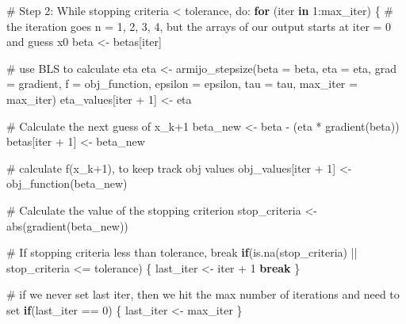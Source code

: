 \documentclass[
  letterpaper,
  DIV=11,
  numbers=noendperiod]{scrartcl}
\newenvironment{Shaded}{\begin{snugshade}}{\end{snugshade}}
\newcommand{\AttributeTok}[1]{\textcolor[rgb]{0.40,0.45,0.13}{#1}}
\newcommand{\CommentTok}[1]{\textcolor[rgb]{0.37,0.37,0.37}{#1}}
\newcommand{\ControlFlowTok}[1]{\textcolor[rgb]{0.00,0.23,0.31}{\textbf{#1}}}
\newcommand{\DecValTok}[1]{\textcolor[rgb]{0.68,0.00,0.00}{#1}}
\newcommand{\FunctionTok}[1]{\textcolor[rgb]{0.28,0.35,0.67}{#1}}
\newcommand{\NormalTok}[1]{\textcolor[rgb]{0.00,0.23,0.31}{#1}}
\newcommand{\OtherTok}[1]{\textcolor[rgb]{0.00,0.23,0.31}{#1}}
\newcommand{\SpecialCharTok}[1]{\textcolor[rgb]{0.37,0.37,0.37}{#1}}
\begin{document}
\begin{Shaded}
\begin{Highlighting}[]
  \CommentTok{\# Step 2: While stopping criteria \textless{} tolerance, do:}
  \ControlFlowTok{for}\NormalTok{ (iter }\ControlFlowTok{in} \DecValTok{1}\SpecialCharTok{:}\NormalTok{max\_iter) \{ }\CommentTok{\# the iteration goes n = 1, 2, 3, 4, but the arrays of our output starts at iter = 0 and guess x0}
\NormalTok{    beta }\OtherTok{\textless{}{-}}\NormalTok{ betas[iter]}
    
    \CommentTok{\# use BLS to calculate eta}
\NormalTok{    eta }\OtherTok{\textless{}{-}} \FunctionTok{armijo\_stepsize}\NormalTok{(}\AttributeTok{beta =}\NormalTok{ beta, }\AttributeTok{eta =}\NormalTok{ eta, }\AttributeTok{grad =}\NormalTok{ gradient, }\AttributeTok{f =}\NormalTok{ obj\_function, }\AttributeTok{epsilon =}\NormalTok{ epsilon, }\AttributeTok{tau =}\NormalTok{ tau, }\AttributeTok{max\_iter =}\NormalTok{ max\_iter)}
\NormalTok{    eta\_values[iter }\SpecialCharTok{+} \DecValTok{1}\NormalTok{] }\OtherTok{\textless{}{-}}\NormalTok{ eta}
    
    \CommentTok{\# Calculate the next guess of x\_k+1}
\NormalTok{    beta\_new }\OtherTok{\textless{}{-}}\NormalTok{ beta }\SpecialCharTok{{-}}\NormalTok{ (eta }\SpecialCharTok{*} \FunctionTok{gradient}\NormalTok{(beta))}
\NormalTok{    betas[iter }\SpecialCharTok{+} \DecValTok{1}\NormalTok{] }\OtherTok{\textless{}{-}}\NormalTok{ beta\_new}
    
    \CommentTok{\# calculate f(x\_k+1), to keep track obj values}
\NormalTok{    obj\_values[iter }\SpecialCharTok{+} \DecValTok{1}\NormalTok{] }\OtherTok{\textless{}{-}} \FunctionTok{obj\_function}\NormalTok{(beta\_new)}
    
    \CommentTok{\# Calculate the value of the stopping criterion}
\NormalTok{    stop\_criteria }\OtherTok{\textless{}{-}} \FunctionTok{abs}\NormalTok{(}\FunctionTok{gradient}\NormalTok{(beta\_new))}
    
    \CommentTok{\# If stopping criteria less than tolerance, break}
    \ControlFlowTok{if}\NormalTok{(}\FunctionTok{is.na}\NormalTok{(stop\_criteria) }\SpecialCharTok{||}\NormalTok{ stop\_criteria }\SpecialCharTok{\textless{}=}\NormalTok{ tolerance) \{ }
\NormalTok{      last\_iter }\OtherTok{\textless{}{-}}\NormalTok{ iter }\SpecialCharTok{+} \DecValTok{1}
      \ControlFlowTok{break} 
\NormalTok{    \}}
    
    \CommentTok{\# if we never set last iter, then we hit the max number of iterations and need to set}
    \ControlFlowTok{if}\NormalTok{(last\_iter }\SpecialCharTok{==} \DecValTok{0}\NormalTok{) \{ last\_iter }\OtherTok{\textless{}{-}}\NormalTok{ max\_iter \}}
    

\end{Highlighting}
\end{Shaded}
\end{document}
